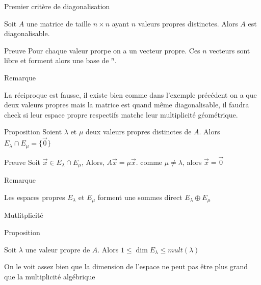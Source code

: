 \begin{parag}{Premier critère de diagonalisation}
    \begin{theoreme}
        Soit $A$ une matrice de taille $n \times n$ ayant $n$ valeurs propres distinctes. Alors $A$ est diagonalisable.
    \end{theoreme}
    \begin{subparag}{Preuve}
        Pour chaque valeur prorpe on a un vecteur propre. Ces $n$ vecteurs sont libre et forment alors une base de \R$^n$.
    \end{subparag}
        \begin{subparag}{Remarque}
        \begin{framedremark}
        La réciproque est fausse, il existe bien comme dans l'exemple précédent on a que deux valeurs propres mais la matrice est quand même diagonalisable, il faudra check si leur espace propre respectifs matche leur multiplicité géométrique.
        \end{framedremark}
    \end{subparag}

    \begin{subparag}{Proposition}
        Soient $\lambda$ et $\mu$ deux valeurs propres distinctes de $A$. Alors $E_\lambda \cap E_\mu = \{\vec{0}\}$
    \end{subparag}
    \begin{subparag}{Preuve}
        Soit $\vec{x} \in E_\lambda \cap E_\mu$, Alors, $A\vec{x} = \mu\vec{x}$. comme $\mu \neq \lambda$, alors $\vec{x}= \vec{0}$
    \end{subparag}
    \begin{subparag}{Remarque}
        \begin{framedremark}
            Les espaces propres $E_\lambda$ et $E_\mu$ forment une sommes direct $E_\lambda \oplus E_\mu$
        \end{framedremark}
    \end{subparag}
\end{parag}

\begin{parag}{Mutlitplicité}
    \begin{subparag}{Proposition}
    \begin{theoreme}
        Soit $\lambda$ une valeur propre de $A$. Alors $1 \leq \dim E_\lambda \leq mult(\lambda)$
    \end{theoreme}
    On le voit assez bien que la dimension de l'espace ne peut pas être plus grand que la multiplicité algébrique
    \end{subparag}
    
\end{parag}


